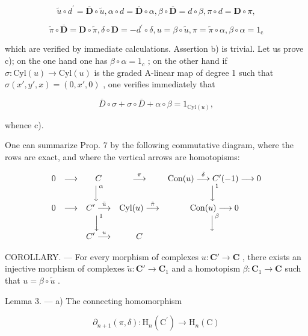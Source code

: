 \[
\tilde {u} \circ d ^ {\prime} = \overline {{\mathbf {D}}} \circ \tilde {u}, \alpha \circ d = \overline {{\mathbf {D}}} \circ \alpha , \beta \circ \overline {{\mathbf {D}}} = d \circ \beta , \pi \circ d = \mathbf {D} \circ \pi ,
\]

\[
\tilde {\pi} \circ \overline {{\mathbf {D}}} = \mathbf {D} \circ \tilde {\pi}, \delta \circ \mathbf {D} = - d ^ {\prime} \circ \delta , u = \beta \circ \tilde {u}, \pi = \tilde {\pi} \circ \alpha , \beta \circ \alpha = 1 _ {\mathrm{c}}
\]

which are verified by immediate calculations. Assertion b) is trivial. Let us prove c); on the one hand one has \(\beta \circ \alpha = 1_{c}\) ; on the other hand if \(\sigma: \text{Cyl}(u) \to \text{Cyl}(u)\) is the graded A-linear map of degree 1 such that \(\sigma(x', y', x) = (0, x', 0)\) , one verifies immediately that

\[
\overline {{{D}}} \circ \sigma + \sigma \circ \overline {{{D}}} + \alpha \circ \beta = 1 _ {\mathrm{Cyl} (u)},
\]

whence c).

One can summarize Prop. 7 by the following commutative diagram, where the rows are exact, and where the vertical arrows are homotopisms:

\[
\begin{array}{c c c c c} 0 & \longrightarrow & C & \stackrel {{\pi}} {{\longrightarrow}} & \operatorname{Con} (u) \stackrel {{\delta}} {{\longrightarrow}} C ^ {\prime} (- 1) \longrightarrow 0 \\ & & \Big \downarrow^ {\alpha} & & \Big \downarrow^ {1} \\ 0 & \longrightarrow & C ^ {\prime} \stackrel {{\bar {u}}} {{\longrightarrow}} & \operatorname{Cyl} (u) \stackrel {{\tilde {\pi}}} {{\longrightarrow}} & \operatorname{Con} (u) \longrightarrow 0 \\ & & \Big \downarrow^ {1} & & \Big \downarrow^ {\beta} \\ & & C ^ {\prime} \stackrel {{u}} {{\longrightarrow}} & C \end{array}
\]

COROLLARY. --- For every morphism of complexes \(u: \mathbf{C}' \to \mathbf{C}\) , there exists an injective morphism of complexes \(\tilde{u}: \mathbf{C}' \to \mathbf{C}_1\) and a homotopism \(\beta: \mathbf{C}_1 \to \mathbf{C}\) such that \(u = \beta \circ \tilde{u}\) .

Lemma 3. --- a) The connecting homomorphism

\[
\partial_ {n + 1} (\pi , \delta): \mathrm{H} _ {n} (\mathrm{C} ^ {\prime}) \rightarrow \mathrm{H} _ {n} (\mathrm{C})
\]

